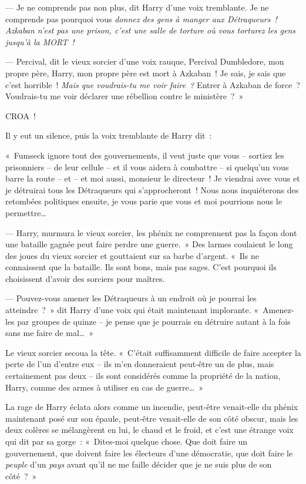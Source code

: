 --- Je ne comprends pas non plus, dit Harry d'une voix tremblante. Je ne comprends pas pourquoi vous \emph{donnez des gens à manger aux Détraqueurs~! Azkaban n'est pas une prison, c'est une salle de torture où vous torturez les gens jusqu'à la MORT~!}

--- Percival, dit le vieux sorcier d'une voix rauque, Percival Dumbledore, mon propre père, Harry, mon propre père est mort à Azkaban~! Je sais, je sais que c'est horrible~! \emph{Mais que voudrais-tu me voir faire~?} Entrer à Azkaban de force~? Voudrais-tu me voir déclarer une rébellion contre le ministère~?~»

CROA~!

Il y eut un silence, puis la voix tremblante de Harry dit~:

«~Fumseck ignore tout des gouvernements, il veut juste que vous -- sortiez les prisonniers -- de leur cellule -- et il vous aidera à combattre -- si quelqu'un vous barre la route -- et -- et moi aussi, monsieur le directeur~! Je viendrai avec vous et je détruirai tous les Détraqueurs qui s'approcheront~! Nous nous inquiéterons des retombées politiques ensuite, je vous parie que vous et moi pourrions nous le permettre…

--- Harry, murmura le vieux sorcier, les phénix ne comprennent pas la façon dont une bataille gagnée peut faire perdre une guerre.~» Des larmes coulaient le long des joues du vieux sorcier et gouttaient sur sa barbe d'argent. «~Ils ne connaissent que la bataille. Ils sont bons, mais pas sages. C'est pourquoi ils choisissent d'avoir des sorciers pour maîtres.

--- Pouvez-vous amener les Détraqueurs à un endroit où je pourrai les atteindre~?~» dit Harry d'une voix qui était maintenant implorante. «~Amenez-les par groupes de quinze -- je pense que je pourrais en détruire autant à la fois sans me faire de mal…~»

Le vieux sorcier secoua la tête. «~C'était suffisamment difficile de faire accepter la perte de l'un d'entre eux -- ils m'en donneraient peut-être un de plus, mais certainement pas deux -- ils sont considérés comme la propriété de la nation, Harry, comme des armes à utiliser en cas de guerre…~»

La rage de Harry éclata alors comme un incendie, peut-être venait-elle du phénix maintenant posé sur son épaule, peut-être venait-elle de son côté obscur, mais les deux colères se mélangèrent en lui, le chaud et le froid, et c'est une étrange voix qui dit par sa gorge~: «~Dites-moi quelque chose. Que doit faire un gouvernement, que doivent faire les électeurs d'une démocratie, que doit faire le \emph{peuple} d'un \emph{pays} avant qu'il ne me faille décider que je ne suis plus de son côté~?~»

